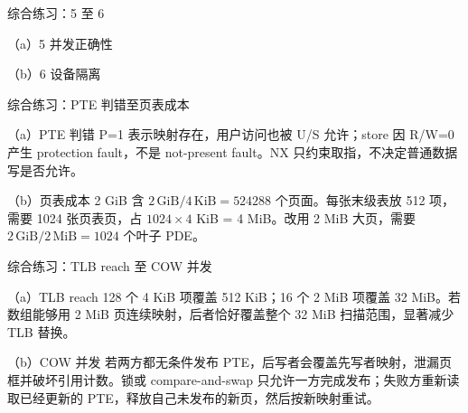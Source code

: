 \begin{chapteranswer}{综合练习：5 至 6}
\begin{answersubproblem}{（a）5}
并发正确性
\end{answersubproblem}
\begin{answersubproblem}{（b）6}
设备隔离
\end{answersubproblem}
\end{chapteranswer}

\begin{chapteranswer}{综合练习：PTE 判错至页表成本}
\begin{answersubproblem}{（a）PTE 判错}
P=1 表示映射存在，用户访问也被 U/S 允许；store 因 R/W=0 产生 protection fault，不是 not-present fault。NX 只约束取指，不决定普通数据写是否允许。
\end{answersubproblem}
\begin{answersubproblem}{（b）页表成本}
2 GiB 含 $2\,\mathrm{GiB}/4\,\mathrm{KiB}=524288$ 个页面。每张末级表放 512 项，需要 1024 张页表页，占 $1024\times4$ KiB = 4 MiB。改用 2 MiB 大页，需要 $2\,\mathrm{GiB}/2\,\mathrm{MiB}=1024$ 个叶子 PDE。
\end{answersubproblem}
\end{chapteranswer}

\begin{chapteranswer}{综合练习：TLB reach 至 COW 并发}
\begin{answersubproblem}{（a）TLB reach}
128 个 4 KiB 项覆盖 512 KiB；16 个 2 MiB 项覆盖 32 MiB。若数组能够用 2 MiB 页连续映射，后者恰好覆盖整个 32 MiB 扫描范围，显著减少 TLB 替换。
\end{answersubproblem}
\begin{answersubproblem}{（b）COW 并发}
若两方都无条件发布 PTE，后写者会覆盖先写者映射，泄漏页框并破坏引用计数。锁或 compare-and-swap 只允许一方完成发布；失败方重新读取已经更新的 PTE，释放自己未发布的新页，然后按新映射重试。
\end{answersubproblem}
\end{chapteranswer}

